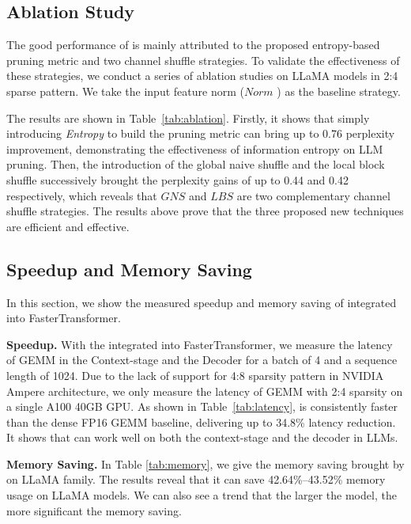\subsection{Ablation Study}

The good performance of \name is mainly attributed to the proposed entropy-based pruning metric and two channel shuffle strategies. 
To validate the effectiveness of these strategies, we conduct a series of ablation studies on LLaMA models in 2:4 sparse pattern.
We take the input feature norm ($Norm$ \cite{sun2023simple}) as the baseline strategy. 

The results are shown in Table~\ref{tab:ablation}. Firstly, it shows that simply introducing \textit{Entropy} to build the pruning metric can bring up to 0.76 perplexity improvement, demonstrating the effectiveness of information entropy on LLM pruning. Then, the introduction of the global naive shuffle and the local block shuffle successively brought the perplexity gains of up to 0.44 and 0.42 respectively, which reveals that $GNS$ and $LBS$ are two complementary channel shuffle strategies.
The results above prove that the three proposed new techniques are efficient and effective.

\subsection{Speedup and Memory Saving}
\label{speedup}

In this section, we show the measured speedup and memory saving of \name integrated into FasterTransformer. 

\textbf{Speedup.} With the \name integrated into FasterTransformer, we measure the latency of GEMM in the Context-stage and the Decoder for a batch of 4 and a sequence length of 1024. Due to the lack of support for 4:8 sparsity pattern in NVIDIA Ampere architecture, we only measure the latency of GEMM with 2:4 sparsity on a single A100 40GB GPU. As shown in Table~\ref{tab:latency}, \name is consistently faster than the dense FP16 GEMM baseline, delivering up to 34.8\% latency reduction. It shows that \name can work well on both the context-stage and the decoder in LLMs.

\textbf{Memory Saving.} In Table \ref{tab:memory}, we give the memory saving brought by \name on LLaMA family. The results reveal that it can save 42.64\%--43.52\% memory usage on LLaMA models. We can also see a trend that the larger the model, the more significant the memory saving.

